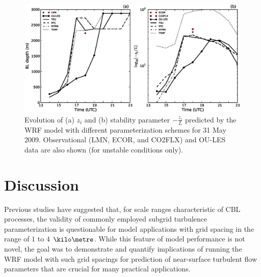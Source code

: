 \begin{figure}[ht!]
\begin{center}
\includegraphics[width=\textwidth]{figures/chapter4/pblh_phi_phys_20090531}
\end{center}
\caption{Evolution of (a) $z_i$ and (b) stability parameter $-\frac{z_i}{L}$ predicted by the WRF model with different parameterization schemes for 31 May 2009. Observational (LMN, ECOR, and CO2FLX) and OU-LES data are also shown (for unstable conditions only).}
\label{figure441}
\end{figure}


\section{Discussion}
\label{dis-48}

Previous studies have suggested that, for scale ranges characteristic of CBL processes, the validity of commonly employed subgrid turbulence parameterization is questionable for model applications with grid spacing in the range of $1$ to $4$ $\kilo\metre$. While this feature of model performance is not novel, the goal was to demonstrate and quantify implications of running the WRF model with such grid spacings for prediction of near-surface turbulent flow parameters that are crucial for many practical applications. 

